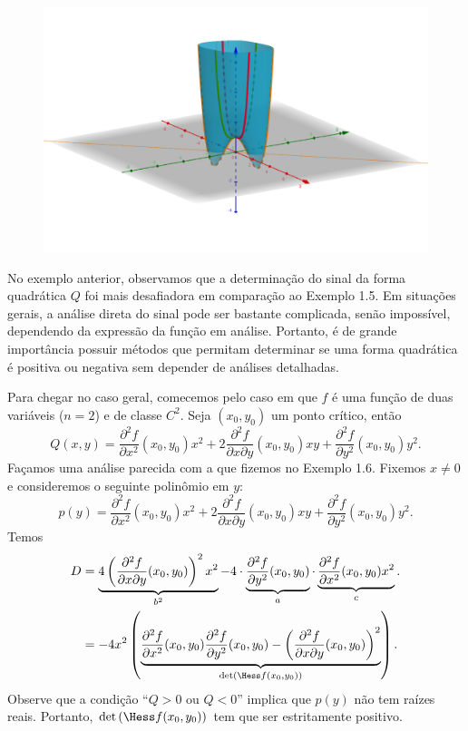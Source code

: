 \begin{example}{}{}
\begin{figure}[H]
    \centering
\includegraphics[scale=0.2]{Figuras/Semana11/fig1}
\end{figure}
\end{example}

No exemplo anterior, observamos que a determinação do sinal da forma quadrática $Q$ foi mais desafiadora em comparação ao Exemplo 1.5. Em situações gerais, a análise direta do sinal pode ser bastante complicada, senão impossível, dependendo da expressão da função em análise. Portanto, é de grande importância possuir métodos que permitam determinar se uma forma quadrática é positiva ou negativa sem depender de análises detalhadas.

Para chegar no caso geral, comecemos pelo caso em que $f$ é uma função de duas variáveis ($n=2$) e de classe $C^2$. Seja $(x_0,y_0)$ um ponto crítico, então
\begin{equation}\label{eq:q}
Q(x,y) =\frac{\partial^2f}{\partial x^2}(x_0,y_0)x^2 + 2 \frac{\partial^2f}{\partial x\partial y}(x_0,y_0)xy + \frac{\partial^2f}{\partial y^2}(x_0,y_0)y^2. 
\end{equation}
Façamos uma análise parecida com a que fizemos no Exemplo 1.6. Fixemos $x\neq 0$  e consideremos o seguinte polinômio em $y$:
$$p(y)=\frac{\partial^2f}{\partial x^2}(x_0,y_0)x^2 + 2 \frac{\partial^2f}{\partial x\partial y}(x_0,y_0)xy + \frac{\partial^2f}{\partial y^2}(x_0,y_0)y^2.$$
Temos
\begin{align*}
D & = \underbrace{4\left(\frac{\partial^2f}{\partial x\partial y}(x_0,y_0)\right)^2x^2}_{b^2}-4\cdot \underbrace{\frac{\partial^2f}{\partial y^2}(x_0,y_0)}_{a}\cdot \underbrace{\frac{\partial^2f}{\partial x^2}(x_0,y_0)x^2}_c.\\
&= -4x^2\left( \underbrace{\frac{\partial^2f}{\partial x^2}(x_0,y_0) \frac{\partial^2f}{\partial y^2}(x_0,y_0)-\left(\frac{\partial^2f}{\partial x\partial y}(x_0,y_0)\right)^2}_{\det \left(\Hess f(x_0,y_0)\right)}\right). 
\end{align*}
Observe que a condição ``$Q>0$ ou $Q<0$'' implica que $p(y)$ não tem raízes reais. Portanto, $\det \left(\Hess f(x_0,y_0)\right)$ tem que ser estritamente positivo. 

